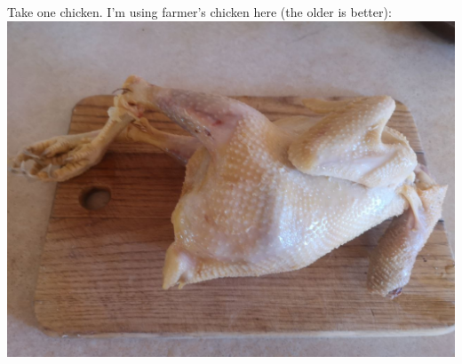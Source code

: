 \documentclass[11pt,a4paper]{article}
\begin{document}
Take one chicken. I'm using farmer's chicken here (the older is better):
\includegraphics[width=\textwidth]{1.jpg}
\end{document}
